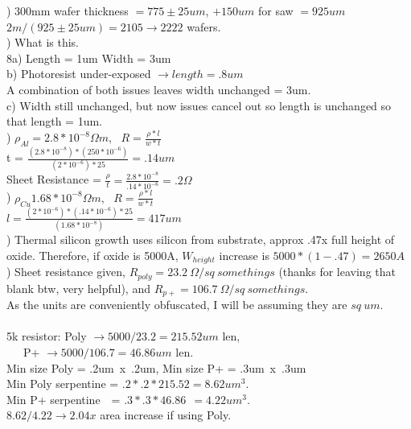 \documentclass[12pt]{article}
\begin{document}
) 300mm wafer thickness $= 775 \pm 25um$, $+ 150um$ for saw $= 925um$\\
$2m / (925 \pm 25um ) = 2105 \to 2222$ wafers.\\


) What is this.\\


\noindent 8a) Length = 1um Width = 3um\\
b) Photoresist under-exposed $\to length = .8 um$\\
A combination of both issues leaves width unchanged = 3um.\\
c) Width still unchanged, but now issues cancel out so length is unchanged so that length = 1um.\\


) $\rho_{Al} = 2.8*10^{-8}\Omega m,\ \ \  R = \frac{\rho*l}{w*t}$\\
t = $ \frac{ (2.8*10^{-8}) * (250*10^{-6}) }{ (2*10^{-6}) * 25 } = .14um $\\
Sheet Resistance = $\frac{\rho}{t} = \frac{2.8*10^{-8}}{.14*10^{-6}} = .2\Omega$ \\


)   $\rho_{Cu} 1.68*10^{-8}\Omega m,\ \ \  R = \frac{\rho*l}{w*t}$\\
$ l = \frac{ (2*10^{-6}) * (.14*10^{-6}) * 25 }{(1.68*10^{-8})} = 417um $\\

) Thermal silicon growth uses silicon from substrate, approx .47x full height of oxide. Therefore, if oxide is 5000A, $W_{height}$ increase is $5000*(1-.47) = 2650A$  \\

) Sheet resistance given, $R_{poly} = 23.2\ \Omega/sq\ somethings$ (thanks for leaving that blank btw, very helpful), and $R_{p+} = 106.7\ \Omega/sq\ somethings$.\\
As the units are conveniently obfuscated, I will be assuming they are $sq\ um$.\\\\
5k resistor: Poly $\to 5000/23.2= 215.52um $ len,\\ 
\indent \indent \indent \ \ \ P+ $\to 5000/106.7 = 46.86um$ len.\\
Min size Poly = .2um\ x\ .2um, Min size P+ = .3um\ x\ .3um\\
Min Poly serpentine = $.2*.2*215.52 = 8.62um^3$.\\ 
Min P+ serpentine\ \ = $.3*.3*46.86\ \ = 4.22 um^3$.\\
$8.62/4.22 \to 2.04x$ area increase if using Poly.
\end{document}

